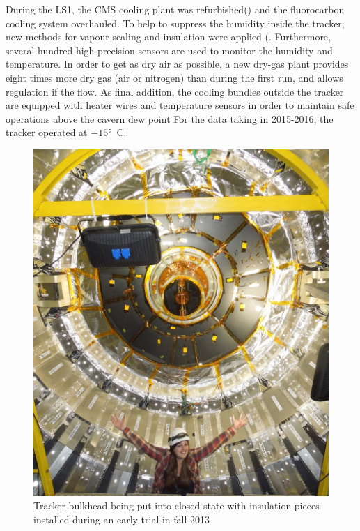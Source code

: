 During the LS1, the CMS cooling plant was refurbished\cite{running:1998606}() and the fluorocarbon cooling system overhauled. To help to suppress the humidity inside the tracker, new methods for vapour sealing and insulation were applied (. Furthermore, several hundred high-precision sensors are used to monitor the humidity and temperature. In order to get as dry air as possible, a new dry-gas plant provides eight times more dry gas (air or nitrogen) than during the first run, and allows regulation if the flow. As final addition, the cooling bundles outside the tracker are equipped with heater wires and temperature sensors in order to maintain safe operations above the cavern dew point For the data taking in 2015-2016, the tracker operated at $-15$\si{ \degree C}.

\begin{figure}[htbp]
	\centering
	\begin{minipage}[t]{0.4\textwidth}
		\includegraphics[width=\textwidth]{2_ExperimentalSetup/Figures/BHIsis}
		\caption{Tracker bulkhead being put into closed state with insulation pieces installed during an early trial in fall 2013}
		\label{fig:TrackLS11}
	\end{minipage}
	\hfill
	\begin{minipage}[t]{0.59\textwidth}
		

\end{minipage}
\end{figure}
